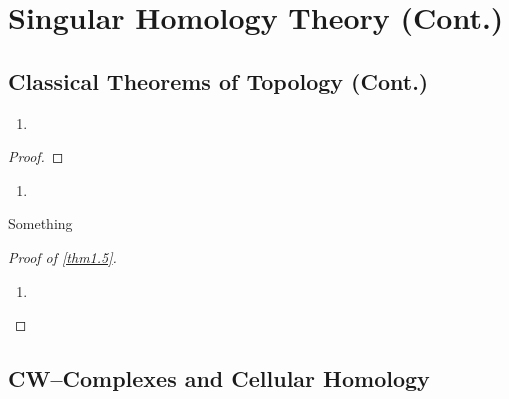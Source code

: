 \section{Singular Homology Theory (Cont.)}
\subsection{Classical Theorems of Topology (Cont.)}

\begin{lemma}
\end{lemma}

\begin{corollary}\InsertTheoremBreak\label{cor1.2}
  \begin{enumerate}
  \item 
  \end{enumerate}
\end{corollary}

\begin{theorem}
\end{theorem}
\begin{proof}

\end{proof}


\begin{remark}\InsertTheoremBreak
  \begin{enumerate}
  \item 
  \end{enumerate}
\end{remark}

Something

\begin{proof}[Proof of \autoref{thm1.5}]\InsertTheoremBreak
  \begin{enumerate}
  \item 
  \end{enumerate}
\end{proof}


\subsection{CW--Complexes and Cellular Homology}

